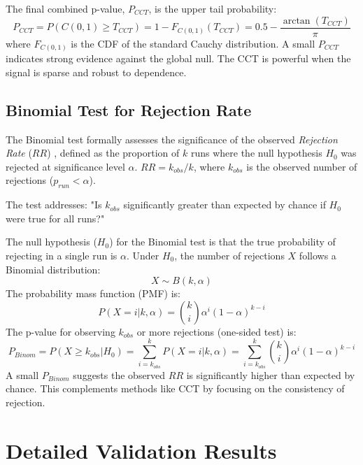\begin{appendices}
  The final combined p-value, $P_{CCT}$, is the upper tail probability:
  \begin{equation}
    P_{CCT} = P(C(0,1) \ge T_{CCT}) = 1 - F_{C(0,1)}(T_{CCT}) = 0.5 - \frac{\arctan(T_{CCT})}{\pi}
    \label{eq:cct_pvalue}
  \end{equation}
  where $F_{C(0,1)}$ is the CDF of the standard Cauchy distribution. A small $P_{CCT}$ indicates strong evidence against the global null. The CCT is powerful when the signal is sparse and robust to dependence.

  \section{Binomial Test for Rejection Rate}
  \label{sec:binom_test_methodology}

  The Binomial test formally assesses the significance of the observed \textit{Rejection Rate} ($RR$) \autocite{fahrmeir2016statistik}, defined as the proportion of $k$ runs where the null hypothesis $H_0$ was rejected at significance level $\alpha$. $RR = k_{obs}/k$, where $k_{obs}$ is the observed number of rejections ($p_{run} < \alpha$).

  The test addresses: "Is $k_{obs}$ significantly greater than expected by chance if $H_0$ were true for all runs?"

  The null hypothesis ($H_0$) for the Binomial test is that the true probability of rejecting in a single run is $\alpha$. Under $H_0$, the number of rejections $X$ follows a Binomial distribution:
  \begin{equation}
    X \sim B(k, \alpha)
  \end{equation}
  The probability mass function (PMF) is:
  \begin{equation}
    P(X=i | k, \alpha) = \binom{k}{i} \alpha^i (1-\alpha)^{k-i}
    \label{eq:binom_pmf}
  \end{equation}
  The p-value for observing $k_{obs}$ or more rejections (one-sided test) is:
  \begin{equation}
    P_{Binom} = P(X \ge k_{obs} | H_0) = \sum_{i=k_{obs}}^{k} P(X=i | k, \alpha) = \sum_{i=k_{obs}}^{k} \binom{k}{i} \alpha^i (1-\alpha)^{k-i}
    \label{eq:binom_pvalue}
  \end{equation}
  A small $P_{Binom}$ suggests the observed $RR$ is significantly higher than expected by chance. This complements methods like CCT by focusing on the consistency of rejection.


  \chapter{Detailed Validation Results}
  \label{app:detailed_results}


\end{appendices}
